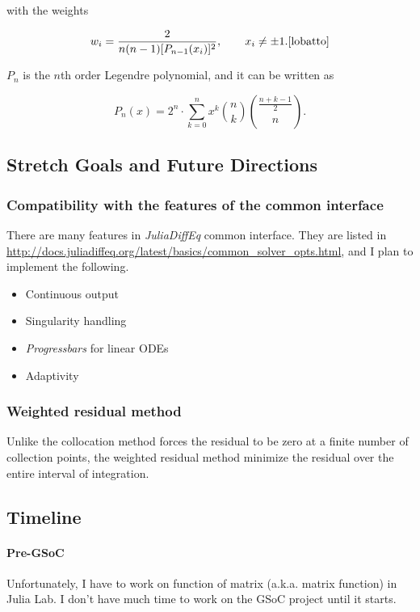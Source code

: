 \documentclass[a4paper,12pt,onecolumn]{article}
\begin{document}
with the weights

\[w_{i}={\frac {2}{n(n-1)[P_{n-1}(x_{i})]^{2}}},\qquad x_{i}\neq \pm 1. \cite{lobatto}\]

$P_n$ is the $n$th order Legendre polynomial, and it can be written as

\[P_{n}(x)=2^{n} \cdot \sum _{k=0}^{n}x^{k}\binom{n}{k}\binom{{\frac {n+k-1}{2}}}{n}.\]

\subsection{Stretch Goals and Future Directions}
\subsubsection{Compatibility with the features of the common interface}
There are many features in \textit{JuliaDiffEq} common interface. They are listed in
\url{http://docs.juliadiffeq.org/latest/basics/common_solver_opts.html}, and I plan to
implement the following.
\begin{itemize}
	\item Continuous output
	\item Singularity handling
	\item \textit{Progressbars} for linear ODEs
	\item Adaptivity
\end{itemize}


\subsubsection{Weighted residual method}
Unlike the collocation method forces the residual to be zero at a finite number of
collection points, the weighted residual method minimize the residual over the entire
interval of integration.

\subsection{Timeline}
\paragraph{Pre-GSoC} %
\label{par:pre_gsoc}
Unfortunately, I have to work on function of matrix (a.k.a. matrix function) in Julia Lab.
I don't have much time to work on the GSoC project until it starts.
\end{document}
